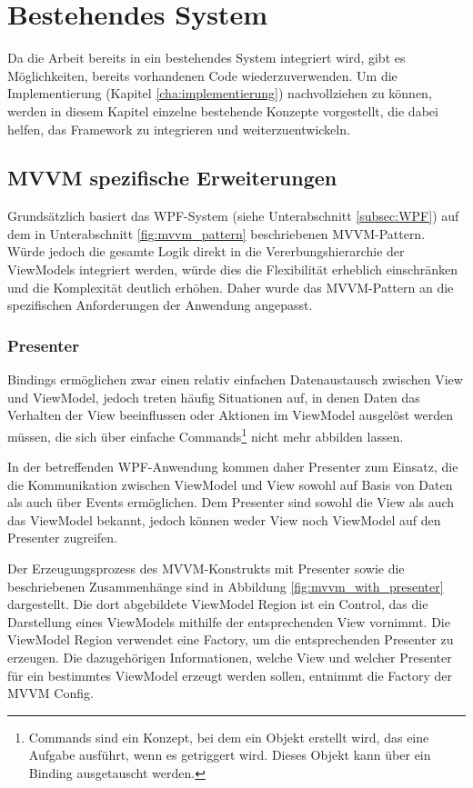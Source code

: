 \chapter{Bestehendes System}
\label{cha:basis}
Da die Arbeit bereits in ein bestehendes System integriert wird, gibt es Möglichkeiten, bereits vorhandenen Code wiederzuverwenden. Um die Implementierung (Kapitel \ref{cha:implementierung}) nachvollziehen zu können, werden in diesem Kapitel einzelne bestehende Konzepte vorgestellt, die dabei helfen, das Framework zu integrieren und weiterzuentwickeln.

\section{MVVM spezifische Erweiterungen}
\label{sec:mvvm_extensions}
Grundsätzlich basiert das WPF-System (siehe Unterabschnitt \ref{subsec:WPF}) auf dem in Unterabschnitt \ref{fig:mvvm_pattern} beschriebenen MVVM-Pattern. Würde jedoch die gesamte Logik direkt in die Vererbungshierarchie der ViewModels integriert werden, würde dies die Flexibilität erheblich einschränken und die Komplexität deutlich erhöhen. Daher wurde das MVVM-Pattern an die spezifischen Anforderungen der Anwendung angepasst.

\subsection{Presenter}
Bindings ermöglichen zwar einen relativ einfachen Datenaustausch zwischen View und ViewModel, jedoch treten häufig Situationen auf, in denen Daten das Verhalten der View beeinflussen oder Aktionen im ViewModel ausgelöst werden müssen, die sich über einfache Commands\footnote{Commands \cite{wpf_commanding_overview} sind ein Konzept, bei dem ein Objekt erstellt wird, das eine Aufgabe ausführt, wenn es getriggert wird. Dieses Objekt kann über ein Binding ausgetauscht werden.} nicht mehr abbilden lassen. 

In der betreffenden WPF-Anwendung kommen daher Presenter zum Einsatz, die die Kommunikation zwischen ViewModel und View sowohl auf Basis von Daten als auch über Events ermöglichen. Dem Presenter sind sowohl die View als auch das ViewModel bekannt, jedoch können weder View noch ViewModel auf den Presenter zugreifen.

Der Erzeugungsprozess des MVVM-Konstrukts mit Presenter sowie die beschriebenen Zusammenhänge sind in Abbildung \ref{fig:mvvm_with_presenter} dargestellt. Die dort abgebildete ViewModel Region ist ein Control, das die Darstellung eines ViewModels mithilfe der entsprechenden View vornimmt. Die ViewModel Region verwendet eine Factory, um die entsprechenden Presenter zu erzeugen. Die dazugehörigen Informationen, welche View und welcher Presenter für ein bestimmtes ViewModel erzeugt werden sollen, entnimmt die Factory der MVVM Config. 

